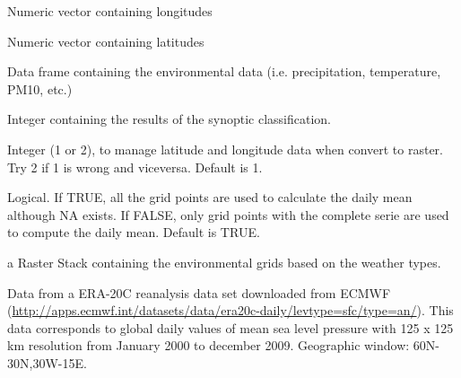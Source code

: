 \documentclass[a4paper]{book}
\begin{document}
\begin{Arguments}
\begin{ldescription}
\item[\code{longitude}] Numeric vector containing longitudes

\item[\code{latitude}] Numeric vector containing latitudes

\item[\code{grid\_data}] Data frame containing the environmental data (i.e. precipitation, temperature, PM10, etc.)

\item[\code{cluster\_data}] Integer containing the results of the synoptic classification.

\item[\code{option}] Integer (1 or 2), to manage latitude and longitude data when convert to raster. Try 2 if 1 is wrong and viceversa. Default is 1.

\item[\code{na.rm}] Logical. If TRUE, all the grid points are used to calculate the daily mean although NA exists. If FALSE, only grid points with the complete serie are used to compute the daily mean. Default is TRUE.
\end{ldescription}
\end{Arguments}
%
\begin{Value}
a Raster Stack containing the environmental grids based on the weather types.
\end{Value}
%
\begin{Examples}
\end{Examples}
%
\begin{Description}\relax
Data from a ERA-20C reanalysis data set downloaded from ECMWF
(\url{http://apps.ecmwf.int/datasets/data/era20c-daily/levtype=sfc/type=an/}).
This data corresponds to global daily values of mean sea level pressure with 125 x 125 km resolution from January 2000 to december 2009. Geographic window: 60N-30N,30W-15E.
\end{Description}
\end{document}
